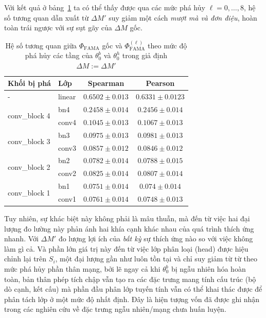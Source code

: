 Với kết quả ở bảng~\ref{tab:sanity_theta0_results_another} ta có thể thấy được qua các mức phá hủy $\ell=0,\dots,8$, hệ số tương quan dẫn xuất từ $\Delta M'$ suy giảm một cách \emph{mượt mà và đơn điệu}, hoàn toàn trái ngược với sự sụt gãy của $\Delta M$ gốc.

\begin{table}[H]
\centering
\caption{Hệ số tương quan giữa $\Phi_{\text{FAMA}}$ gốc và $\Phi_{\text{FAMA}}^{(\ell)}$ theo mức độ phá hủy các tầng của $\theta_0^b$ và $\theta_0^h$ trong giả định $\Delta M := \Delta M'$}
\label{tab:sanity_theta0_results_another}
\begin{tabular}{|l|l|c|c|}
\hline
\textbf{Khối bị phá} & \textbf{Lớp} & \textbf{Spearman} & \textbf{Pearson} \\ \hline
- & linear & $0.6502 \pm 0.013$ & $0.6331 \pm 0.0123$ \\ \hline
\multirow{2}{*}{conv\_block 4} & bn4 & $0.2458 \pm 0.014$ & $0.2456 \pm 0.014$ \\ \cline{2-4} 
 & conv4 & $0.1045 \pm 0.013$ & $0.1067 \pm 0.013$ \\ \hline
\multirow{2}{*}{conv\_block 3} & bn3 & $0.0975 \pm 0.013$ & $0.0981 \pm 0.013$ \\ \cline{2-4} 
 & conv3 & $0.0857 \pm 0.012$ & $0.0846 \pm 0.012$ \\ \hline
\multirow{2}{*}{conv\_block 2} & bn2 & $0.0782 \pm 0.014$ & $0.0788 \pm 0.015$ \\ \cline{2-4} 
 & conv2 & $0.0825 \pm 0.014$ & $0.0807 \pm 0.014$ \\ \hline
\multirow{2}{*}{conv\_block 1} & bn1 & $0.0751 \pm 0.014$ & $0.074 \pm 0.014$ \\ \cline{2-4} 
 & conv1 & $0.0761 \pm 0.014$ & $0.0748 \pm 0.013$ \\ \hline
\end{tabular}
\end{table}

Tuy nhiên, sự khác biệt này không phải là mâu thuẫn, mà đến từ việc hai đại lượng đo lường này phản ánh hai khía cạnh khác nhau của quá trình thích ứng nhanh. Với $\Delta M'$ đo lượng lợi ích của \emph{bất kỳ} sự thích ứng nào so với việc không làm gì cả. Và phần lớn giá trị này đến từ việc lớp phân loại (head) được hiệu chỉnh lại trên $S_i$, một đại lượng gần như luôn tồn tại và chỉ suy giảm từ từ theo mức phá hủy phần thân mạng, bởi lẽ ngay cả khi $\theta_0^b$ bị ngẫu nhiên hóa hoàn toàn, bản thân phép tích chập vẫn tạo ra các đặc trưng mang tính cấu trúc (bộ dò cạnh, kết cấu) mà phần đầu phân lớp tuyến tính vẫn có thể khai thác được để phân tách lớp ở một mức độ nhất định. Đây là hiện tượng vốn đã được ghi nhận trong các nghiên cứu về đặc trưng ngẫu nhiên/mạng chưa huấn luyện.

